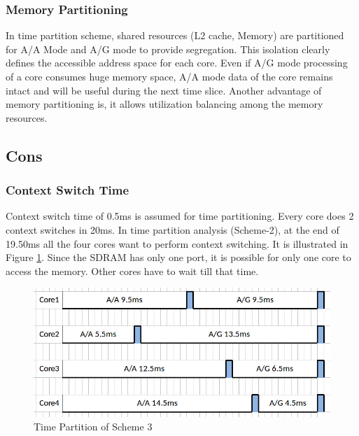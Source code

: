 \subsubsection{Memory Partitioning}
In time partition scheme, shared resources (L2 cache, Memory) are partitioned for A/A Mode and A/G mode to provide segregation. This isolation clearly defines the accessible address space for each core. Even if A/G mode processing of a core consumes huge memory space, A/A mode data of the core remains intact and will be useful during the next time slice. Another advantage of memory partitioning is, it allows utilization balancing among the memory resources.

\subsection{Cons}
\label{mm:cons}
\subsubsection{Context Switch Time}
Context switch time of 0.5ms is assumed for time partitioning. Every core does 2 context switches in 20ms. In time partition analysis (Scheme-2), at the end of 19.50ms all the four cores want to perform context switching. It is illustrated in Figure \ref{fig:mm:mm_cons1}. Since the SDRAM has only one port, it is possible for only one core to access the memory. Other cores have to wait till that time. 

\begin{figure}[h!]
	\centering
	\includegraphics[width=120mm]{figures/mm_cons1}
	\caption{Time Partition of Scheme 3}
	\label{fig:mm:mm_cons1}
\end{figure}

